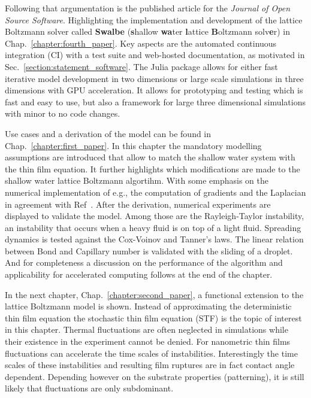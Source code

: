 Following that argumentation is the published article for the \textit{Journal of Open Source Software}. 
Highlighting the implementation and development of the lattice Boltzmann solver called \textbf{Swalbe} (\textbf{s}hallow \textbf{wa}ter \textbf{l}attice \textbf{B}oltzmann solv\textbf{e}r) in Chap.~\ref{chapter:fourth_paper}.
Key aspects are the automated continuous integration (CI) with a test suite and web-hosted documentation, as motivated in Sec.~\ref{section:statement_software}.
The Julia package allows for either fast iterative model development in two dimensions or large scale simulations in three dimensions with GPU acceleration.
It allows for prototyping and testing which is fast and easy to use, but also a framework for large three dimensional simulations with minor to no code changes.

Use cases and a derivation of the model can be found in Chap.~\ref{chapter:first_paper}.
In this chapter the mandatory modelling assumptions are introduced that allow to match the shallow water system with the thin film equation.
It further highlights which modifications are made to the shallow water lattice Boltzmann algortihm. 
With some emphasis on the numerical implementation of e.g., the computation of gradients and the Laplacian in agreement with Ref~\cite{junkDiscretizationsIncompressibleNavier2000, thampiIsotropicDiscreteLaplacian2013}. 
After the derivation, numerical experiments are displayed to validate the model. 
Among those are the Rayleigh-Taylor instability, an instability that occurs when a heavy fluid is on top of a light fluid. 
Spreading dynamics is tested against the Cox-Voinov and Tanner's laws. 
The linear relation between Bond and Capillary number is validated with the sliding of a droplet.
And for completeness a discussion on the performance of the algorithm and applicability for accelerated computing follows at the end of the chapter.

In the next chapter, Chap.~\ref{chapter:second_paper}, a functional extension to the lattice Boltzmann model is shown.
Instead of approximating the deterministic thin film equation the stochastic thin film equation (STF) is the topic of interest in this chapter.
Thermal fluctuations are often neglected in simulations while their existence in the experiment cannot be denied.
For nanometric thin films fluctuations can accelerate the time scales of instabilities. 
Interestingly the time scales of these instabilities and resulting film ruptures are in fact contact angle dependent.
Depending however on the substrate properties (patterning), it is still likely that fluctuations are only subdominant.

